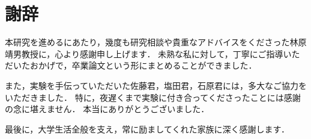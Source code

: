 \chapter*{謝辞}

本研究を進めるにあたり，幾度も研究相談や貴重なアドバイスをくださった林原靖男教授に，心より感謝申し上げます．
未熟な私に対して，丁寧にご指導いただいたおかげで，卒業論文という形にまとめることができました．

また，実験を手伝っていただいた佐藤君，塩田君，石原君には，多大なご協力をいただきました．
特に，夜遅くまで実験に付き合ってくださったことには感謝の念に堪えません．
本当にありがとうございました．

最後に，大学生活全般を支え，常に励ましてくれた家族に深く感謝します．
%
